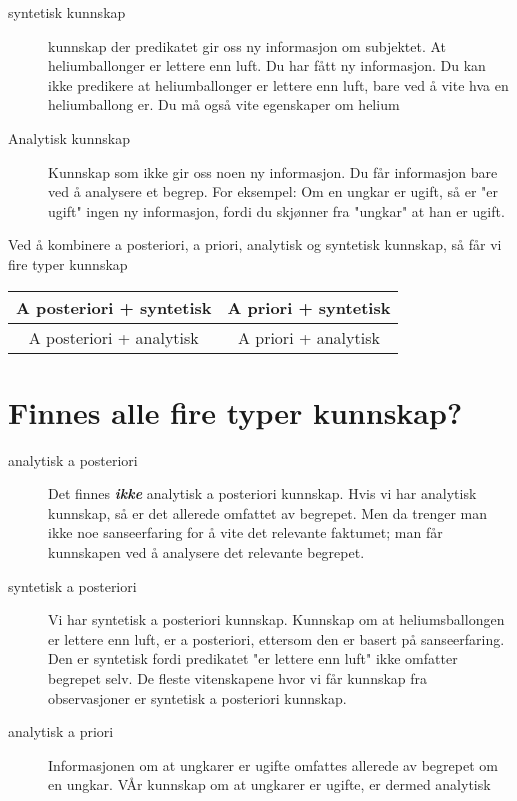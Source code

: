 \documentclass[11pt, a4paper]{article}
\begin{document}
\begin{description}
    \item[syntetisk kunnskap] kunnskap der predikatet gir oss ny informasjon om subjektet. At heliumballonger er lettere enn luft. Du har fått ny informasjon. Du kan ikke predikere at heliumballonger er lettere enn luft, bare ved å vite hva en heliumballong er. Du må også vite egenskaper om helium
    \item[Analytisk kunnskap] Kunnskap som ikke gir oss noen ny informasjon. Du får informasjon bare ved å analysere et begrep. For eksempel: Om en ungkar er ugift, så er "er ugift" ingen ny informasjon, fordi du skjønner fra "ungkar" at han er ugift. 
\end{description}

Ved å kombinere a posteriori, a priori, analytisk og syntetisk kunnskap, så får vi fire typer kunnskap

\begin{table}[h!]
\centering
\begin{tabular}{|c|c|}
\hline
A posteriori + syntetisk & A priori + syntetisk \\
\hline
A posteriori + analytisk & A priori + analytisk \\
\hline

\end{tabular}
\end{table}


\section{Finnes alle fire typer kunnskap?}


\begin{description}
    \item[analytisk a posteriori] Det finnes \textbf{\textit{ikke}} analytisk a posteriori kunnskap. Hvis vi har analytisk kunnskap, så er det allerede omfattet av begrepet. Men da trenger man ikke noe sanseerfaring for å vite det relevante faktumet; man får kunnskapen ved å analysere det relevante begrepet.
    \item[syntetisk a posteriori] Vi har syntetisk a posteriori kunnskap. Kunnskap om at heliumsballongen er lettere enn luft, er a posteriori, ettersom den er basert på sanseerfaring. Den er syntetisk fordi predikatet "er lettere enn luft" ikke omfatter begrepet selv. De fleste vitenskapene hvor vi får kunnskap fra observasjoner er syntetisk a posteriori kunnskap. 
    \item[analytisk a priori] Informasjonen om at ungkarer er ugifte omfattes allerede av begrepet om en ungkar. VÅr kunnskap om at ungkarer er ugifte, er dermed analytisk
\end{description}
\end{document}
